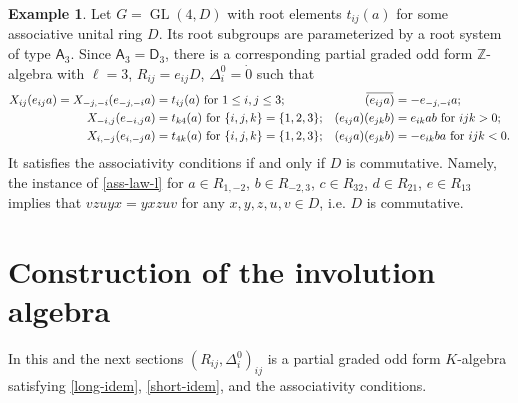 \documentclass{article}
\theoremstyle{definition}
\newtheorem{example}{Example}
\DeclareMathOperator\glin{GL}
\newcommand{\inv}[1]{
    \!\;\overline{
        \!\!\:#1\vphantom !\!\!\:
    }\;\!
}
\begin{document}
\begin{example}
    Let \(
        G = \glin(4, D)
    \) with root elements \(t_{ij}(a)\) for some associative unital ring \(D\). Its root subgroups are parameterized by a root system of type \(\mathsf A_3\). Since \(
        \mathsf A_3 = \mathsf D_3
    \), there is a corresponding partial graded odd form \(\mathbb Z\)-algebra with \(\ell = 3\), \(
        R_{ij} = e_{ij} D
    \), \(
        \Delta^0_i = \dot 0
    \) such that
    \begin{align*}
        X_{ij}(e_{ij} a)
        =
        X_{-j, -i}(e_{-j, -i} a)
        &=
        t_{ij}(a)
        \text{ for } 1 \leq i, j \leq 3;
        &
        \inv{ (e_{ij} a) } &= -e_{-j, -i} a;
        \\
        X_{-i, j}(e_{-i, j} a) &= t_{k4}(a)
        \text{ for } \{i, j, k\} = \{1, 2, 3\};
        &
        (e_{ij} a) (e_{jk} b) &= e_{ik} ab
        \text{ for } ijk > 0;
        \\
        X_{i, -j}(e_{i, -j} a) &= t_{4k}(a)
        \text{ for } \{i, j, k\} = \{1, 2, 3\};
        &
        (e_{ij} a) (e_{jk} b) &= -e_{ik} ba
        \text{ for } ijk < 0.
    \end{align*}
    It satisfies the associativity conditions if and only if \(D\) is commutative. Namely, the instance of \ref{ass-law-l} for \(a \in R_{1, -2}\), \(b \in R_{-2, 3}\), \(c \in R_{32}\), \(d \in R_{21}\), \(e \in R_{13}\) implies that \(
        vzuyx = yxzuv
    \) for any \(
        x, y, z, u, v \in D
    \), i.e. \(D\) is commutative.
\end{example}



\section{Construction of the involution algebra}

In this and the next sections \((R_{ij}, \Delta^0_i)_{ij}\) is a partial graded odd form \(K\)-algebra satisfying \ref{long-idem}, \ref{short-idem}, and the associativity conditions.
\end{document}
